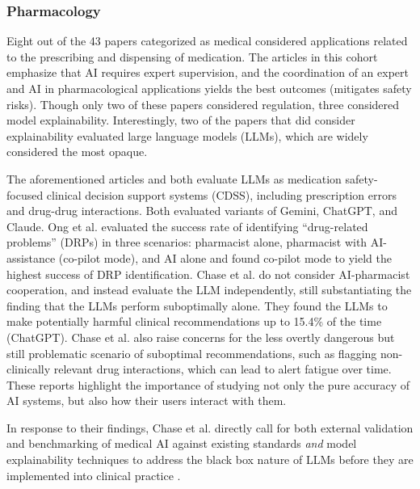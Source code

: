 \documentclass[preprint,12pt]{elsarticle}
\begin{document}
\subsubsection{Pharmacology}
Eight out of the 43 papers categorized as medical considered applications
related to the prescribing and dispensing of medication. The articles in this
cohort emphasize that AI requires expert supervision, and the coordination of an
expert and AI in pharmacological applications yields the best outcomes
(mitigates safety risks). Though only two of these papers considered regulation,
three considered model explainability. Interestingly, two of the papers that did
consider explainability evaluated large language models (LLMs), which are widely
considered the most opaque. 

The aforementioned articles \cite{ongLargeLanguageModel2025} and
\cite{chaseEvaluationLargeLanguage2025} both evaluate LLMs as medication
safety-focused clinical decision support systems (CDSS), including prescription
errors and drug-drug interactions. Both evaluated variants of Gemini, ChatGPT,
and Claude. Ong et al. \cite{ongLargeLanguageModel2025} evaluated the success
rate of identifying ``drug-related problems'' (DRPs) in three scenarios:
pharmacist alone, pharmacist with AI-assistance (co-pilot mode), and AI alone
and found co-pilot mode to yield the highest success of DRP identification.
Chase et al. \cite{chaseEvaluationLargeLanguage2025} do not consider
AI-pharmacist cooperation, and instead evaluate the LLM independently, still
substantiating the finding that the LLMs perform suboptimally alone. They found
the LLMs to make potentially harmful clinical recommendations up to 15.4\% of
the time (ChatGPT). Chase et al. \cite{chaseEvaluationLargeLanguage2025} also
raise concerns for the less overtly dangerous but still problematic scenario of
suboptimal recommendations, such as flagging non-clinically relevant drug
interactions, which can lead to alert fatigue over time. These reports highlight
the importance of studying not only the pure accuracy of AI systems, but also
how their users interact with them.

In response to their findings, Chase et al. directly call for both external
validation and benchmarking of medical AI against existing standards
\textit{and} model explainability techniques to address the black box nature of
LLMs before they are implemented into clinical practice
\cite{chaseEvaluationLargeLanguage2025}. 
\end{document}
